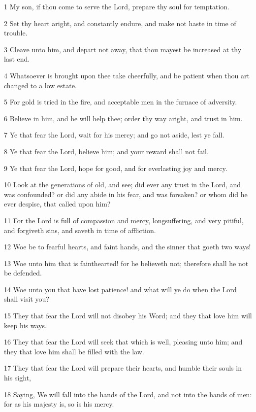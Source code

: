 \par 1 My son, if thou come to serve the Lord, prepare thy soul for temptation.
\par 2 Set thy heart aright, and constantly endure, and make not haste in time of trouble.
\par 3 Cleave unto him, and depart not away, that thou mayest be increased at thy last end.
\par 4 Whatsoever is brought upon thee take cheerfully, and be patient when thou art changed to a low estate.
\par 5 For gold is tried in the fire, and acceptable men in the furnace of adversity.
\par 6 Believe in him, and he will help thee; order thy way aright, and trust in him.
\par 7 Ye that fear the Lord, wait for his mercy; and go not aside, lest ye fall.
\par 8 Ye that fear the Lord, believe him; and your reward shall not fail.
\par 9 Ye that fear the Lord, hope for good, and for everlasting joy and mercy.
\par 10 Look at the generations of old, and see; did ever any trust in the Lord, and was confounded? or did any abide in his fear, and was forsaken? or whom did he ever despise, that called upon him?
\par 11 For the Lord is full of compassion and mercy, longsuffering, and very pitiful, and forgiveth sins, and saveth in time of affliction.
\par 12 Woe be to fearful hearts, and faint hands, and the sinner that goeth two ways!
\par 13 Woe unto him that is fainthearted! for he believeth not; therefore shall he not be defended.
\par 14 Woe unto you that have lost patience! and what will ye do when the Lord shall visit you?
\par 15 They that fear the Lord will not disobey his Word; and they that love him will keep his ways.
\par 16 They that fear the Lord will seek that which is well, pleasing unto him; and they that love him shall be filled with the law.
\par 17 They that fear the Lord will prepare their hearts, and humble their souls in his sight,
\par 18 Saying, We will fall into the hands of the Lord, and not into the hands of men: for as his majesty is, so is his mercy.

